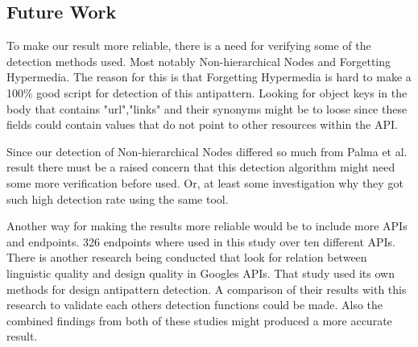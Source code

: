 \subsection{Future Work}

To make our result more reliable, there is a need for verifying some of the detection methods used. Most notably Non-hierarchical Nodes and Forgetting Hypermedia. The reason for this is that Forgetting Hypermedia is hard to make a 100\% good script for detection of this antipattern. Looking for object keys in the body that contains "url","links" and their synonyms might be to loose since these fields could contain values that do not point to other resources within the API. 

Since our detection of Non-hierarchical Nodes differed so much from Palma et al. \cite{linguistic} result there must be a raised concern that this detection algorithm might need some more verification before used. Or, at least some investigation why they got such high detection rate using the same tool.

Another way for making the results more reliable would be to include more APIs and endpoints. 326 endpoints where used in this study over ten different APIs. There is another research being conducted that look for relation between linguistic quality and design quality in Googles APIs. That study used its own methods for design antipattern detection. A comparison of their results with this research to validate each others detection functions could be made. Also the combined findings from both of these studies might produced a more accurate result.